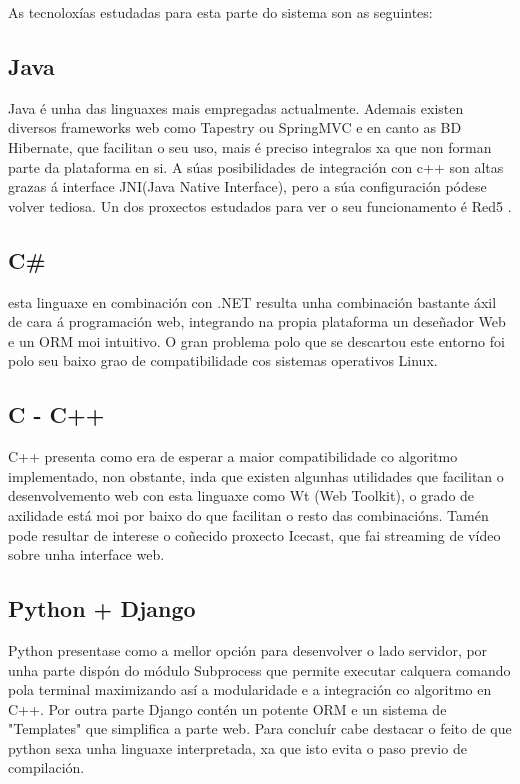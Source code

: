 	As tecnoloxías estudadas para esta parte do sistema son as seguintes:

	\subsection{Java}
  	Java é unha das linguaxes mais empregadas actualmente. Ademais existen diversos
  	frameworks web como Tapestry ou SpringMVC e en canto as BD Hibernate, que facilitan o 
  	seu uso, mais é preciso integralos xa que non forman parte da plataforma en si. A súas 
  	posibilidades de integración con c++ son altas grazas á interface JNI(Java Native 
  	Interface), pero a súa configuración pódese volver tediosa. Un dos proxectos estudados
  	para ver o seu funcionamento é Red5 \cite{red5-github-url}.
  	
	\subsection{C\#}
	esta linguaxe en combinación con .NET resulta unha combinación bastante áxil de cara
	á programación web, integrando na propia plataforma un deseñador Web e un ORM moi 
	intuitivo. O gran problema polo que se descartou este entorno foi polo seu baixo grao
	de compatibilidade cos sistemas operativos Linux.
	
	\subsection{C - C++}
	C++ presenta como era de esperar a maior compatibilidade co algoritmo implementado, non
	obstante, inda que existen algunhas utilidades que facilitan o desenvolvemento web con 
	esta linguaxe como Wt (Web Toolkit)\cite{wt-url}, o grado de axilidade está moi por 
	baixo do que facilitan o resto das combinacións. Tamén pode resultar de interese o
	coñecido proxecto Icecast\cite{icecast-url}, que fai streaming de vídeo sobre unha 
	interface web.
	
	\subsection{Python + Django}
	Python presentase como a mellor opción para desenvolver o lado servidor, por unha parte
	dispón do módulo Subprocess\cite{subprocess-module-url} que permite executar calquera
	comando pola terminal maximizando así a modularidade e a integración co algoritmo en C++.
	Por outra parte Django\cite{django-web-page-url} contén un potente ORM e un sistema de 
	"Templates" que simplifica a parte web. Para concluír cabe destacar o feito de que 
	python sexa unha linguaxe interpretada, xa que isto evita o paso previo de compilación.
	
